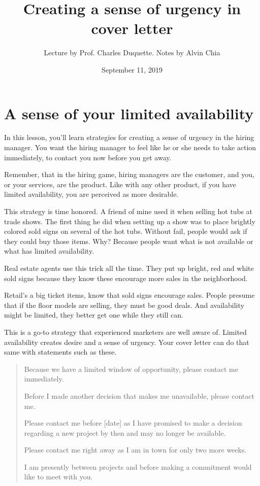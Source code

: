 \documentclass[12pt]{article}
\begin{document}
\title{Creating a sense of urgency in cover letter}
\author{Lecture by Prof. Charles Duquette. Notes by Alvin Chia}
\date{September 11, 2019}
\maketitle
\setcounter{secnumdepth}{1}
\section{A sense of your limited availability}
In this lesson, you'll learn strategies for creating a sense of urgency
in the hiring manager. You want the hiring manager to feel like he or
she needs to take action immediately, to contact you now before you get
away.

Remember, that in the hiring game, hiring managers are the customer, and
you, or your services, are the product. Like with any other product, if
you have limited availability, you are perceived as more desirable.

This strategy is time honored. A friend of mine used it when selling hot
tubs at trade shows. The first thing he did when setting up a show was
to place brightly colored sold signs on several of the hot tubs. Without
fail, people would ask if they could buy those items. Why? Because
people want what is not available or what has limited availability.

Real estate agents use this trick all the time. They put up bright, red
and white sold signs because they know these encourage more sales in the
neighborhood.

Retail's a big ticket items, know that sold signs encourage sales.
People presume that if the floor models are selling, they must be good
deals. And availability might be limited, they better get one while they
still can.

This is a go-to strategy that experienced marketers are well aware of.
Limited availability creates desire and a sense of urgency. Your cover
letter can do that same with statements such as these.

\begin{quote}
Because we have a limited window of opportunity, please contact me
immediately.

Before I made another decision that makes me unavailable, please contact
me.

Please contact me before {[}date{]} as I have promised to make a
decision regarding a new project by then and may no longer be available.

Please contact me right away as I am in town for only two more weeks.

I am presently between projects and before making a commitment would
like to meet with you.
\end{quote}
\end{document}
